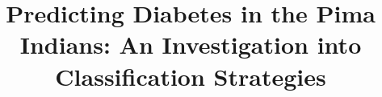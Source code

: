\documentclass[a4paper, 12pt]{article}
\begin{document}
\title{Predicting Diabetes in the Pima Indians: An Investigation into Classification Strategies}
\maketitle

\tableofcontents
\listoffigures
\listoftables









\end{document}
